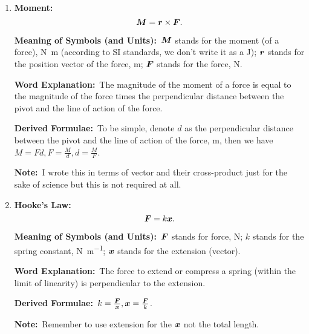 \documentclass[8pt]{article}
\newcommand{\MeanSymb}{\textbf{Meaning of Symbols (and Units):}\ }
\newcommand{\WordExpl}{\textbf{Word Explanation:}\ }
\newcommand{\DeriForm}{\textbf{Derived Formulae:}\ }
\newcommand{\Note}{\textbf{Note:}\ }
\begin{document}
\begin{enumerate}
                \WordExpl Impulse is equal to the change in momentum.

                \DeriForm The following is derived from Newton's 2nd Law:
                \[
                    \vect{I} = \vect{F} \Delta t.
                \]

                \Note This is only meaningful if momentum is conserved - just like work and energy.

                \item \textbf{Moment:}
                \[
                    \boldsymbol{M} = \boldsymbol{r} \times \boldsymbol{F}.
                \]

                \MeanSymb \(\boldsymbol{M}\) stands for the moment (of a force), \unit{\newton \metre} (according to SI standards, we don't write it as a \unit{\joule}); \(\boldsymbol{r}\) stands for the position vector of the force, \unit{\metre}; \(\boldsymbol{F}\) stands for the force, \unit{\newton}.

                \WordExpl The magnitude of the moment of a force is equal to the magnitude of the force times the perpendicular distance between the pivot and the line of action of the force.

                \DeriForm To be simple, denote \(d\) as the perpendicular distance between the pivot and the line of action of the force, \unit{\metre}, then we have \(M = Fd, F = \frac{M}{d}, d = \frac{M}{F}\).

                \Note I wrote this in terms of vector and their cross-product just for the sake of science but this is not required at all.

                \item \textbf{Hooke's Law:}
                \[
                    \boldsymbol{F} = k \boldsymbol{x}.
                \]

                \MeanSymb \(\boldsymbol{F}\) stands for force, \unit{\newton}; \(k\) stands for the spring constant, \unit{\newton \per \metre}; \(\boldsymbol{x}\) stands for the extension (vector).

                \WordExpl The force to extend or compress a spring (within the limit of linearity) is perpendicular to the extension.

                \DeriForm \(k = \frac{\boldsymbol{F}}{\boldsymbol{x}}, \boldsymbol{x} = \frac{\boldsymbol{F}}{k}\).

                \Note Remember to use extension for the \(\boldsymbol{x}\) not the total length.
            \end{enumerate}
\end{document}
